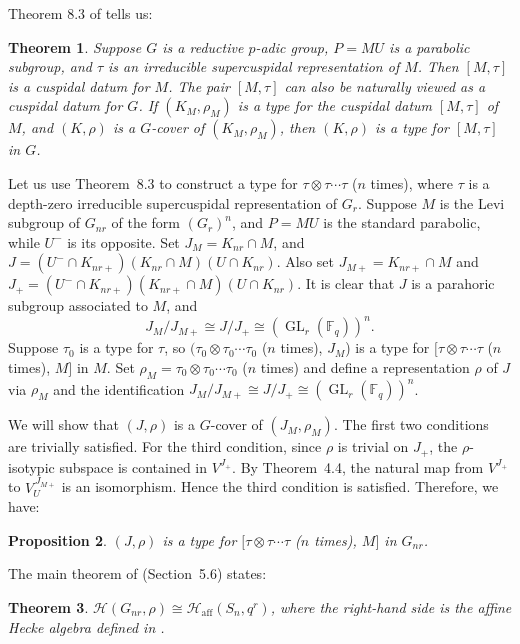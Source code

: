 \documentclass[12pt]{article}
\newtheorem{theorem}{Theorem}[section]
\newtheorem{proposition}[theorem]{Proposition}
\theoremstyle{remark}
\begin{document}
Theorem 8.3 of \cite{BushnellKutzko1998} tells us:
\begin{theorem}
Suppose $G$ is a reductive $p$-adic group, $P=MU$ is a parabolic subgroup, and $\tau$ is an irreducible supercuspidal representation of $M$. Then $[M,\tau]$ is a cuspidal datum for $M$. The pair $[M,\tau]$ can also be naturally viewed as a cuspidal datum for $G$. If $(K_M,\rho_M)$ is a type for the cuspidal datum $[M,\tau]$ of $M$, and $(K,\rho)$ is a $G$-cover of $(K_M,\rho_M)$, then $(K,\rho)$ is a type for $[M,\tau]$ in $G$.
\end{theorem}

Let us use Theorem~8.3 to construct a type for $\tau \otimes \tau \cdots \tau$ ($n$ times), where $\tau$ is a depth-zero irreducible supercuspidal representation of $G_r$. Suppose $M$ is the Levi subgroup of $G_{nr}$ of the form $(G_r)^n$, and $P=MU$ is the standard parabolic, while $U^-$ is its opposite. Set $J_M = K_{nr} \cap M$, and $J = (U^-\cap K_{nr+})(K_{nr}\cap M)(U \cap K_{nr})$. Also set $J_{M+} = K_{nr+}\cap M$ and $J_+ = (U^-\cap K_{nr+})(K_{nr+}\cap M)(U \cap K_{nr})$. It is clear that $J$ is a parahoric subgroup associated to $M$, and
$$
J_M/J_{M+} \cong J/J_+ \cong (\operatorname{GL}_r(\mathbb{F}_q))^n .
$$
Suppose $\tau_0$ is a type for $\tau$, so $(\tau_0 \otimes \tau_0 \cdots \tau_0$ ($n$ times), $J_M$) is a type for $[\tau \otimes \tau \cdots \tau$ ($n$ times), $M]$ in $M$. Set $\rho_M = \tau_0 \otimes \tau_0 \cdots \tau_0$ ($n$ times) and define a representation $\rho$ of $J$ via $\rho_M$ and the identification $J_M/J_{M+} \cong J/J_+ \cong (\operatorname{GL}_r(\mathbb{F}_q))^n$.

We will show that $(J,\rho)$ is a $G$-cover of $(J_M,\rho_M)$. The first two conditions are trivially satisfied. For the third condition, since $\rho$ is trivial on $J_+$, the $\rho$-isotypic subspace is contained in $V^{J_+}$. By Theorem~4.4, the natural map from $V^{J_+}$ to $V_U^{\,J_{M+}}$ is an isomorphism. Hence the third condition is satisfied. Therefore, we have:

\begin{proposition}
$(J,\rho)$ is a type for $[\tau \otimes \tau \cdots \tau$ ($n$ times), $M]$ in $G_{nr}$.
\end{proposition}

The main theorem of \cite{BushnellKutzko1993} (Section~5.6) states:
\begin{theorem}
$\mathcal{H}(G_{nr},\rho) \cong \mathcal{H}_{\mathrm{aff}}(S_n, q^r)$, where the right-hand side is the affine Hecke algebra defined in \cite[5.4.6]{BushnellKutzko1993}.
\end{theorem}
\end{document}
